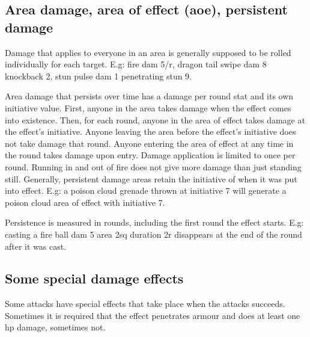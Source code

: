 



\subsection*{Area damage, area of effect (aoe), persistent damage}
Damage that applies to everyone in an area is generally supposed to be rolled individually for each target. E.g: fire dam 5/r, dragon tail swipe dam 8 knockback 2, stun pulse dam 1 penetrating stun 9.

Area damage that persists over time has a damage per round stat and its own initiative value. First, anyone in the area takes damage when the effect comes into existence. Then, for each round, anyone in the area of effect takes damage at the effect's initiative. Anyone leaving the area before the effect's initiative does not take damage that round. Anyone entering the area of effect at any time in the round takes damage upon entry. Damage application is limited to once per round. Running in and out of fire does not give more damage than just standing still. Generally, persistent damage areas retain the initiative of when it was put into effect. E.g: a poison cloud grenade thrown at initiative 7 will generate a poison cloud area of effect with initiative 7.

Persistence is measured in rounds, including the first round the effect starts. E.g: casting a fire ball dam 5 area 2sq duration 2r disappears at the end of the round after it was cast.


\subsection*{Some special damage effects}
Some attacks have special effects that take place when the attacks succeeds. Sometimes it is required that the effect penetrates armour and does at least one hp damage, sometimes not.


